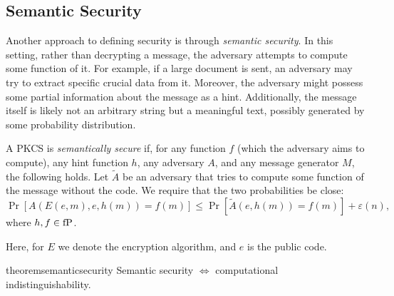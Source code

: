 \subsection{Semantic Security}

Another approach to defining security is through \emph{semantic security}.
In this setting, rather than decrypting a message, the adversary attempts to compute some function of it.
For example, if a large document is sent, an adversary may try to extract specific crucial data from it.
Moreover, the adversary might possess some partial information about the message as a hint.
Additionally, the message itself is likely not an arbitrary string but a meaningful text, possibly generated by some probability distribution.

\begin{definition} \label{def:semantic_security}
	A PKCS is \emph{semantically secure} if, for any function $f$ (which the adversary aims to compute), any hint function $h$, any adversary $A$, and any message generator $M$, the following holds.
	Let $\tilde{A}$ be an adversary that tries to compute some function of the message without the code.
	We require that the two probabilities be close:
	 \[
		 \Pr[A(E(e, m), e, h(m)) = f(m)] \le  \Pr[\tilde{A}(e, h(m)) = f(m)] + \varepsilon(n),
	 \] 
	 where $h, f \in \operatorname{fP}$.
\end{definition}
Here, for $E$ we denote the encryption algorithm, and $e$ is the public code.

\begin{restatable}{theorem}{semanticsecurity} \label{thm:semantic_security}
	Semantic security $\iff$ computational indistinguishability.
\end{restatable}


